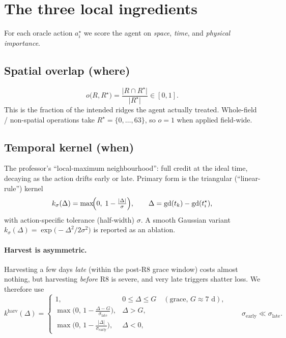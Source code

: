 \documentclass[11pt]{article}
\newcommand{\gd}{\mathrm{gd}}        %
\begin{document}
\section{The three local ingredients}

For each oracle action $a^\star_i$ we score the agent on \emph{space}, \emph{time},
and \emph{physical importance}.

\subsection{Spatial overlap (where)}
\[
o\bigl(R,R^\star\bigr)=\frac{\lvert R\cap R^\star\rvert}{\lvert R^\star\rvert}\in[0,1].
\]
This is the fraction of the intended ridges the agent actually treated.
Whole-field / non-spatial operations take $R^\star=\{0,\dots,63\}$, so $o=1$ when
applied field-wide.

\subsection{Temporal kernel (when)}
The professor's ``local-maximum neighbourhood'': full credit at the ideal time,
decaying as the action drifts early or late. Primary form is the triangular
(``linear-rule'') kernel
\[
k_\sigma(\Delta)=\max\!\Bigl(0,\;1-\tfrac{\lvert\Delta\rvert}{\sigma}\Bigr),
\qquad \Delta=\gd(t_k)-\gd(t^\star_i),
\]
with action-specific tolerance (half-width) $\sigma$. A smooth Gaussian variant
\(
k_\sigma(\Delta)=\exp\!\bigl(-\Delta^2/2\sigma^2\bigr)
\)
is reported as an ablation.

\paragraph{Harvest is asymmetric.} Harvesting a few days \emph{late} (within the
post-R8 grace window) costs almost nothing, but harvesting \emph{before} R8 is
severe, and very late triggers shatter loss. We therefore use
\[
k^{\mathrm{harv}}(\Delta)=
\begin{cases}
1, & 0\le \Delta\le G \quad(\text{grace, }G\approx7\text{ d}),\\[2pt]
\max\!\bigl(0,\,1-\tfrac{\Delta-G}{\sigma_{\mathrm{late}}}\bigr), & \Delta>G,\\[4pt]
\max\!\bigl(0,\,1-\tfrac{\lvert\Delta\rvert}{\sigma_{\mathrm{early}}}\bigr), & \Delta<0,
\end{cases}
\qquad \sigma_{\mathrm{early}}\ll\sigma_{\mathrm{late}} .
\]
\end{document}
